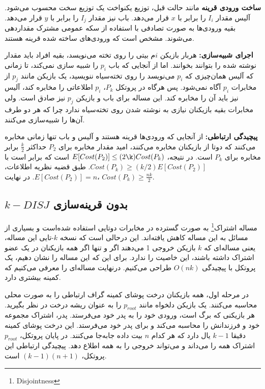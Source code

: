 \textbf{ساخت ورودی قرینه}
مانند حالت قبل، توزیع یکنواخت یک توزیع سخت محسوب می‌شود. آلیس مقدار $I_{i}$ را برابر با $x$ قرار می‌دهد. باب نیز مقدار $I_{j}$ را برابر با $y$ قرار می‌دهد. بقیه ورودی‌ها به صورت تصادفی با استفاده از سکه عمومی مشترک مقداردهی می‌شوند. مشخص است که ورودی‌های ساخته شده قرینه هستند. 

\textbf{اجرای شبیه‌سازی:}
هربار بازیکن $i$م بیتی را روی تخته می‌نویسد، بقیه افراد باید مقدار نوشته شده را بتوانند بخوانند. اما از آنجایی که باب $p_{i}$ را شبیه سازی نمی‌کند، تا زمانی که آلیس همان‌چیزی که $p_{i}$ می‌نویسد را روی تخته‌‌سیاه ننویسید، یک بازیکن مانند $p_{j}$ از مخابرات $p_{i}$ آگاه نمی‌شود. پس هرگاه در پروتکل $P_{k}$، $p_{i}$ اطلاعاتی را مخابره کند، آلیس نیز باید آن‌ را مخابره کند. این مساله برای باب و بازیکن $p_{j}$ نیز صادق است. ولی مخابرات بقیه بازیکنان نیازی به نوشته شدن روی تخته‌سیاه ندارد چرا که هر دو طرف آن‌ها را شبیه‌سازی می‌کنند. 

 \textbf{پیچیدگی ارتباطی:} 
 از آنجایی که ورودی‌ها قرینه هستند و آلیس و باب تنها زمانی مخابره می‌کنند که دوتا از بازیکنان مخابره می‌کنند، امید مقدار مخابره برای $P_{2}$ حداکثر $\frac{k}{2}$ برابر مخابره برای $P_{k}$ است. در نتیجه، $E[Cost(P_{2})] \leq (2\k)Cost(P_{k})$ است که برابر است با $Cost(P_{k}) \geq (k/2)E[Cost(P_{2})]$. طبق قضیه نظریه اطلاعات، $E[Cost(P_{2})] = n$. در نهایت، $Cost(P_{k}) \geq \frac{nk}{2}$.
\subsection{$k-DISJ$ بدون قرینه‌سازی}
مساله اشتراک\footnote{Disjointness} به صورت گسترده در مخابرات دوتایی استفاده شده‌است و بسیاری از مسائل به این مساله کاهش یافته‌اند. این درحالی است که نسخه $k$-تایی این مساله، یعنی مساله‌ای که $k$ بازیکن خروجی 1 می‌دهند اگر و تنها اگر همه بازیکنان در یک عضو اشتراک داشته باشند، این خاصیت را ندارد. برای این که این مساله را نشان دهیم، یک پروتکل با پیچیدگی $O(nk)$ طراحی می‌کنیم. درنهایت مساله‌ای را معرفی می‌کنیم که کمینه بیشتری دارد. \cite{arkadev14} 

در مرحله اول، همه بازیکنان درخت پوشای کمینه گراف ارتباطی را به صورت محلی محاسبه می‌کنند. یک بازیکن دلخواه مانند $p_{root}$ را به عنوان ریشه درخت در نظر بگیرید. هر بازیکنی که برگ است، ورودی خود را به پدر خود می‌فرستد. پدر، اشتراک مجموعه خود و فرزندانش را محاسبه می‌کند و برای پدر خود می‌فرستد. این درخت پوشای کمینه دقیقا $k-1$ یال دارد که هر کدام $n$ بیت داده جابه‌جا می‌کنند. در پایان پروتکل، $p_{root}$ اشتراک همه را می‌داند و می‌تواند خروجی را به همه اطلاع دهد. پیچیدگی ارتباطی این پروتکل، $(k-1)(n+1)$ است.  

